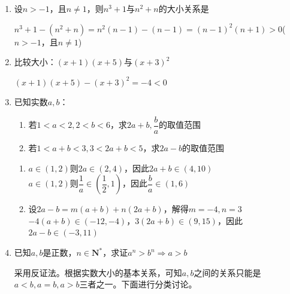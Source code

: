 \begin{enumerate}
\begin{jieda}
\begin{enumerate}
        \end{enumerate}
        \ps 第二个称为\textbf{同向可加性}，第六个称为\textbf{同向同正可乘性}，相对更加重要
    \end{jieda}
    \item 设$n > -1$，且$n \neq 1$，则$n^3+1$与$n^2+n$的大小关系是
    \begin{jieda}
        $n^3+1 - (n^2+n) = n^2(n-1) - (n-1) = (n-1)^2(n+1) > 0$($n > -1$，且$n \neq 1$)
    \end{jieda}
    \item 比较大小：$(x+1)(x+5)$与$(x+3)^2$
    \begin{jieda}
        $(x+1)(x+5) - (x+3)^2 = -4 < 0$
    \end{jieda}
    \item 已知实数$a, b$：
    \begin{enumerate}
        \item 若$1<a<2, 2<b<6$，求$2a+b, \dfrac{b}{a}$的取值范围
        \item 若$1<a+b<3, 3<2a+b<5$，求$2a-b$的取值范围
    \end{enumerate}
    \begin{jieda}
        \begin{enumerate}
            \item $a \in (1, 2)$则$2a \in (2, 4)$，因此$2a+b \in (4, 10)$ \\
            $a \in (1, 2)$则$\dfrac{1}{a} \in \left(\dfrac{1}{2}, 1\right)$，因此$\dfrac{b}{a} \in (1, 6)$
            \item 设$2a-b = m(a+b) + n(2a+b)$，解得$m = -4, n = 3$ \\
            $-4(a+b) \in (-12, -4)$，$3(2a+b) \in (9, 15)$，因此$2a-b \in (-3, 11)$
        \end{enumerate}
    \end{jieda}
    \item 已知$a, b$是正数，$n \in \mathbf{N^*}$，求证$a^n > b^n \Longrightarrow a > b$
    \begin{jieda}
        采用反证法。根据实数大小的基本关系，可知$a, b$之间的关系只能是$a < b, a = b, a > b$三者之一。下面进行分类讨论。
    \end{jieda}
\end{enumerate}

